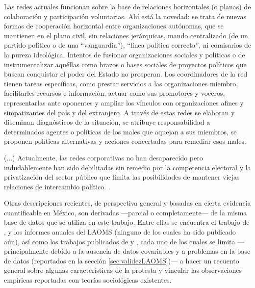 \documentclass[letterpaper, 11pt]{book}
\theoremstyle{definition}
\theoremstyle{remark}
\begin{document}
\begin{center}
\begin{minipage}{0.9\linewidth}
{         Las redes actuales funcionan sobre la base de relaciones horizontales (o planas) de colaboración y participación voluntarias. 
         Ahí está la novedad: se trata de nuevas formas de cooperación horizontal entre organizaciones autónomas, que se mantienen en el plano civil, sin relaciones jerárquicas, mando centralizado (de un partido político o de una “vanguardia”), “línea política correcta”, ni comisarios de la pureza ideológica. 
         Intentos de fusionar organizaciones sociales y políticas o de instrumentalizar aquéllas como brazos o bases sociales de proyectos políticos que buscan conquistar el poder del Estado no prosperan. Los coordinadores de la red tienen tareas específicas, como prestar servicios a las organizaciones miembro, facilitarles recursos e información, actuar como sus promotores y voceros, representarlas ante oponentes y ampliar los vínculos con organizaciones afines y simpatizantes del país y del extranjero.
         A través de estas redes se elaboran y diseminan diagnósticos de la situación, se atribuye responsabilidad a determinados agentes o políticas de los males que aquejan a sus miembros, se proponen políticas alternativas y acciones concertadas para remediar esos males.
         
         (...) Actualmente, las redes corporativas no han desaparecido pero indudablemente han sido debilitadas sin remedio por la competencia electoral y la privatización del sector público que limita las posibilidades de mantener viejas relaciones de intercambio político.
         \normalsize \citep[183--186]{2015_Cadena_Redes}.
        }
    \end{minipage}
\end{center}


Otras descripciones recientes, de perspectiva general y basadas en cierta evidencia cuantificable en México, son derivadas ---parcial o completamente--- de la misma base de datos que se utiliza en este trabajo. 
Entre ellas se encuentra el trabajo de \citet{2017_Urbina_estudiantes}, \citet{2017_Rob_Respuestas} y los informes anuales del LAOMS (ninguno de los cuales ha sido publicado aún), así como los trabajos publicados de \citet{2016_Rob_OMS} y \citet{2016_Cadena_OMS}, cada uno de los cuales se limita ---principalmente debido a la ausencia de datos covariables y a problemas en la base de datos (reportados en la sección \ref{sec:validezLAOMS})--- a hacer un recuento general sobre algunas características de la protesta y vincular las observaciones empíricas reportadas con teorías sociológicas existentes. 
\end{document}
